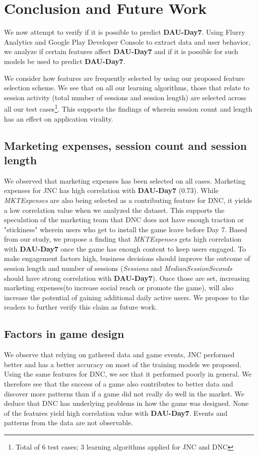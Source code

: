 \section{Conclusion and Future Work}
We now attempt to verify if it is possible to predict \textbf{DAU-Day7}. Using Flurry Analytics and Google Play Developer Console to extract data and user behavior, we analyze if certain features affect \textbf{DAU-Day7} and if it is possible for such models be used to predict \textbf{DAU-Day7}.

We consider how features are frequently selected by using our proposed feature selection scheme. We see that on all our learning algorithms, those that relate to session activity (total number of sessions and session length) are selected across all our test cases\footnote{Total of 6 test cases; 3 learning algorithms applied for JNC and DNC}. This supports the findings of \cite{ref:predicting_player_churn} wherein session count and length has an effect on application virality.

\subsection{Marketing expenses, session count and session length}
We observed that marketing expenses has been selected on all cases. Marketing expenses for JNC has high correlation with \textbf{DAU-Day7} (0.73). While \textit{MKTExpenses} are also being selected as a contributing feature for DNC, it yields a low correlation value when we analyzed the dataset. This supports the speculation of the marketing team that DNC does not have enough traction or "stickiness" wherein users who get to install the game leave before Day 7. Based from our study, we propose a finding that \textit{MKTExpenses} gets high correlation with \textbf{DAU-Day7} once the game has enough content to keep users engaged. To make engagement factors high, business decisions should improve the outcome of session length and number of sessions (\textit{Sessions} and \textit{MedianSessionSeconds} should have strong correlation with \textbf{DAU-Day7}). Once those are set, increasing marketing expenses(to increase social reach or promote the game), will also increase the potential of gaining additional daily active users. We propose to the readers to further verify this claim as future work.

\subsection{Factors in game design}
We observe that relying on gathered data and game events, JNC performed better and has a better accuracy on most of the training models we proposed. Using the same features for DNC, we see that it performed poorly in general. We therefore see that the success of a game also contributes to better data and discover more patterns than if a game did not really do well in the market. We deduce that DNC has underlying problems in how the game was designed. None of the features yield high correlation value with \textbf{DAU-Day7}. Events and patterns from the data are not observable. 

